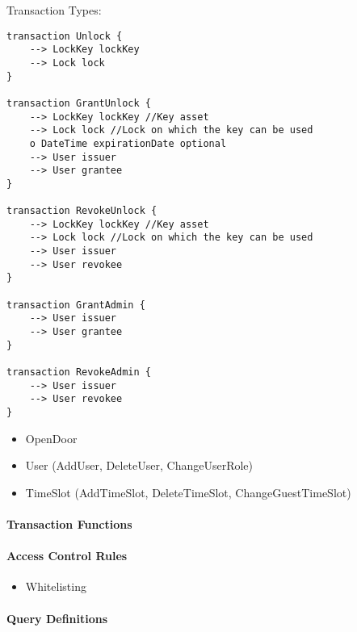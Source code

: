             Transaction Types:
            \begin{lstlisting}[caption={Relevante Transaktionen},label=prototype_transactions,captionpos=b]
transaction Unlock {
    --> LockKey lockKey
    --> Lock lock
}

transaction GrantUnlock {
    --> LockKey lockKey //Key asset
    --> Lock lock //Lock on which the key can be used
	o DateTime expirationDate optional
    --> User issuer
    --> User grantee
}

transaction RevokeUnlock {
    --> LockKey lockKey //Key asset
    --> Lock lock //Lock on which the key can be used
    --> User issuer
    --> User revokee
}

transaction GrantAdmin {
    --> User issuer
    --> User grantee
}

transaction RevokeAdmin {
    --> User issuer
    --> User revokee
}
            \end{lstlisting}
            
            \begin{itemize}[noitemsep]
                \item OpenDoor
                \item User (AddUser, DeleteUser, ChangeUserRole)
                \item TimeSlot (AddTimeSlot, DeleteTimeSlot, ChangeGuestTimeSlot)
            \end{itemize}
    
    \paragraph{Transaction Functions}
    
    \paragraph{Access Control Rules}
        \begin{itemize}
            \item Whitelisting
        \end{itemize}
    
    \paragraph{Query Definitions}
    

